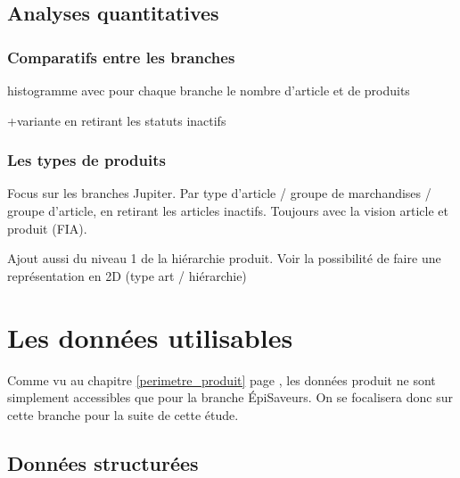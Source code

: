         \section{Analyses quantitatives}
            \subsection{Comparatifs entre les branches}

                histogramme avec pour chaque branche le nombre d'article et de produits

                +variante en retirant les statuts inactifs

            \subsection{Les types de produits}

            Focus sur les branches Jupiter.
            Par type d'article / groupe de marchandises / groupe d'article, en retirant les articles inactifs. Toujours avec la vision article et produit (FIA).

            Ajout aussi du niveau 1 de la hiérarchie produit. Voir la possibilité de faire une représentation en 2D (type art / hiérarchie)

    \chapter{Les données utilisables}
        \large
        Comme vu au chapitre \ref{perimetre_produit} page \pageref{perimetre_produit}, les données produit ne sont simplement accessibles que pour la branche \'{E}piSaveurs.
        On se focalisera donc sur cette branche pour la suite de cette étude.
        \normalsize

        \section{Données structurées}

